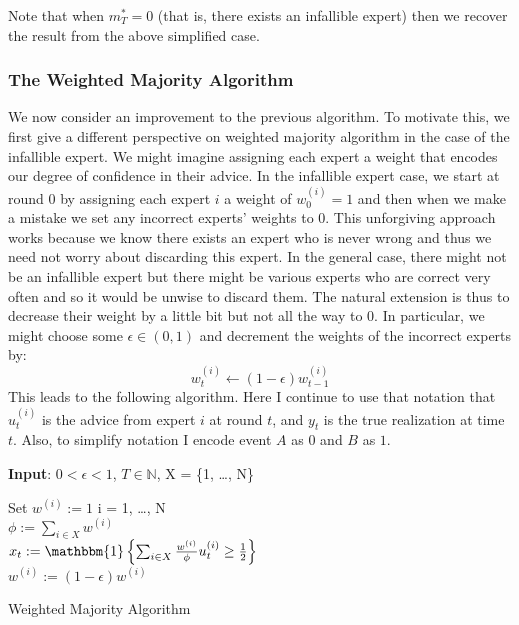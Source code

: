\documentclass[12pt]{article}
\begin{document}
Note that when $m_T^* = 0$ (that is, there exists an infallible expert) then we recover the result from the above simplified case. 


\subsubsection{The Weighted Majority Algorithm}
We now consider an improvement to the previous algorithm. To motivate this, we first give a different perspective on weighted majority algorithm in the case of the infallible expert.
We might imagine assigning each expert a weight that encodes our degree of confidence in their advice. In the infallible expert case, we start at round $0$ by assigning each expert
$i$ a weight of $w^{(i)}_0 = 1$ and then when we make a mistake we set any incorrect experts' weights to $0$. This unforgiving approach works because we know there exists an expert who is never wrong and
thus we need not worry about discarding this expert. In the general case, there might not be an infallible expert but there might be various experts who are correct very often and so it would be unwise 
to discard them. The natural extension is thus to decrease their weight by a little bit but not all the way to $0$. In particular, we might choose some $\epsilon \in (0, 1)$ and decrement the weights of the incorrect
experts by: 
\[w^{(i)}_{t} \gets (1 - \epsilon) w^{(i)}_{t - 1}\]
This leads to the following algorithm. Here I continue to use that notation that $u_t^{(i)}$ is the advice from expert $i$ at round $t$, and $y_t$ is the true realization at time $t$. Also, to simplify notation I encode 
event $A$ as $0$ and $B$ as $1$. 
\bigskip

 \begin{algorithm}[H]
	\SetAlgoLined
	
	\textbf{Input}: $0 < \epsilon < 1$, $T \in \mathbb{N}$,  X = \{1, \dots, N\} \\
	
	\bigskip
	
	Set $w^{(i)} := 1$  i = 1, \dots, N \\
	
	 {
		$\phi := \sum_{i \in X} w^{(i)}$ \\
		$x_t := \mathbbm{1}\left\{\sum_{i \in X} \frac{w^{(i)}}{\phi} u_t^{(i)} \geq \frac{1}{2} \right\}$ \\
		
		 {
			 {
					$w^{(i)} := (1 - \epsilon)w^{(i)}$ \\
			}
		}
	}			
\caption{Weighted Majority Algorithm}
\end{algorithm}
\end{document}
